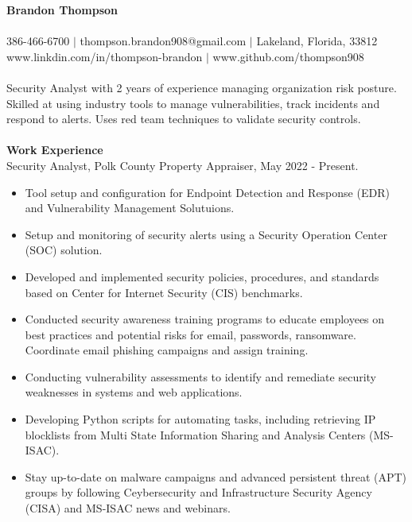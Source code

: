 \documentclass[12pt,a4paper]{article}
\begin{document}
{\centering\textbf{Brandon Thompson}}\\
\\
386-466-6700 $|$ thompson.brandon908@gmail.com $|$ Lakeland, Florida, 33812\\ %
www.linkdin.com/in/thompson-brandon $|$ www.github.com/thompson908
\\
\\
Security Analyst with 2 years of experience managing organization risk posture. Skilled at using industry tools to manage vulnerabilities, track incidents and respond to alerts. Uses red team techniques to validate security controls.
\\
\\
\textbf{Work Experience}\\
Security Analyst, Polk County Property Appraiser, May 2022 - Present.
\begin{itemize}
    \item Tool setup and configuration for Endpoint Detection and Response (EDR) and Vulnerability Management Solutuions.
    \item Setup and monitoring of security alerts using a Security Operation Center (SOC) solution.
    \item Developed and implemented security policies, procedures, and standards based on Center for Internet Security (CIS) benchmarks.
    \item Conducted security awareness training programs to educate employees on best practices and potential risks for email, passwords, ransomware. Coordinate email phishing campaigns and assign training.
    \item Conducting vulnerability assessments to identify and remediate security weaknesses in systems and web applications. %
    \item Developing Python scripts for automating tasks, including retrieving IP blocklists from Multi State Information Sharing and Analysis Centers (MS-ISAC).
    \item Stay up-to-date on malware campaigns and advanced persistent threat (APT) groups by following Ceybersecurity and Infrastructure Security Agency (CISA) and MS-ISAC news and webinars.
\end{itemize}
\end{document}

